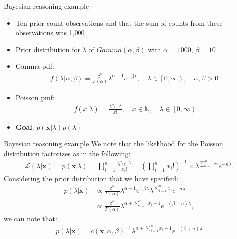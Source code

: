 \documentclass[xcolor=dvipsnames]{beamer}
\begin{document}
\begin{frame}{Bayesian reasoning example}
	\vspace{-15pt}
	\begin{itemize}
		\item Ten prior count observations and that the sum of counts from these observations was 1,000
		\item Prior distribution for $\lambda$ of $Gamma(\alpha, \beta)$ with $\alpha=1000$, $\beta=10$
		\item Gamma pdf:
		\begin{gather*}
		f(\lambda|\alpha,\beta) =\frac{\beta^{\alpha}}{\Gamma(\alpha)}\lambda^{\alpha-1}e^{-\beta \lambda}, \quad \lambda \in \left[0, \infty \right), \quad \alpha,\beta >0.
		\end{gather*}
		\item Poisson pmf:
		\begin{gather*}
			f(x|\lambda)=\frac{\lambda^x e^{-\lambda}}{x!}, \quad x \in \mathbb{N}, \quad \lambda \in \left[0, \infty \right)
		\end{gather*}
		\item \textbf{Goal}:  $p(\textbf{x}|\lambda)p(\lambda)$
	\end{itemize}
\end{frame}

\begin{frame}{Bayesian reasoning example}
		We note that the likelihood for the Poisson distribution factorizes as in the following:
		\begin{align*}
		\mathcal{L}(\lambda|\textbf{x})=p(\textbf{x}|\lambda)=\prod_{i=1}^n \frac{\lambda^{x_i}e^{-\lambda}}{x_i!}= \left( \prod_{i=1}^n x_i! \right)^{-1} \times \lambda^{\sum_{i=1}^n x_i} e^{-n\lambda}. 
		\label{eq:poissonLik}
		\end{align*}
		Considering the prior distribution that we have specified:
		\begin{align*}
		p(\lambda|\textbf{x})&\propto \frac{\beta^{\alpha}}{\Gamma(\alpha)}\lambda^{\alpha-1}e^{-\beta \lambda} \lambda^{\sum_{i=1}^n x_i} e^{-n\lambda} \\
		&\propto \frac{\beta^{\alpha}}{\Gamma(\alpha)} \lambda^{\alpha + \sum_{i=1}^n x_i -1} e^{-(\beta+n)\lambda},
		\end{align*}
		we can note that:
		\begin{align*}
		p(\lambda|\textbf{x}) =c(\textbf{x},\alpha,\beta)^{-1} \lambda^{\alpha + \sum_{i=1}^n x_i -1} e^{-(\beta+n)\lambda}
		\end{align*}
\end{frame}
\end{document}

